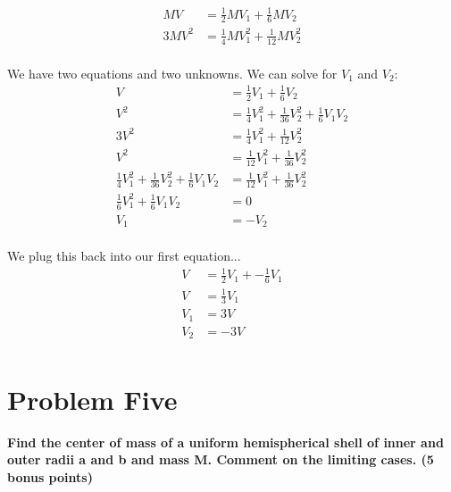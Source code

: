 \documentclass[10pt]{article} %
\begin{document}
\begin{align*}
  MV &= \frac{1}{2}MV_1 + \frac{1}{6}MV_2\\
  3MV^2 &= \frac{1}{4}MV_1^2 + \frac{1}{12}MV_2^2\\
\end{align*}

We have two equations and two unknowns. We can solve for $V_1$ and $V_2$:\\

\begin{align*}
  V &= \frac{1}{2}V_1 + \frac{1}{6}V_2\\
  V^2 &= \frac{1}{4}V_1^2 + \frac{1}{36}V_2^2 + \frac{1}{6}V_1V_2\\
  3V^2 &= \frac{1}{4}V_1^2 + \frac{1}{12}V_2^2\\
  V^2 &= \frac{1}{12}V_1^2 + \frac{1}{36}V_2^2\\
  \frac{1}{4}V_1^2 + \frac{1}{36}V_2^2 + \frac{1}{6}V_1V_2 &= \frac{1}{12}V_1^2 + \frac{1}{36}V_2^2\\
  \frac{1}{6}V_1^2 + \frac{1}{6}V_1V_2 &= 0\\
  V_1 &= -V_2\\
\end{align*}

We plug this back into our first equation...\\

\begin{align*}
  V &= \frac{1}{2}V_1 + -\frac{1}{6}V_1\\
  V &= \frac{1}{3}V_1\\
  V_1 &= 3V\\
  V_2 &= -3V\\
\end{align*}

\section{Problem Five}
\textbf{Find the center of mass of a uniform hemispherical shell of inner and outer radii a and b and mass M. Comment on the limiting cases. (5 bonus points)} \\ \\
\vspace{1 cm}
\end{document}
